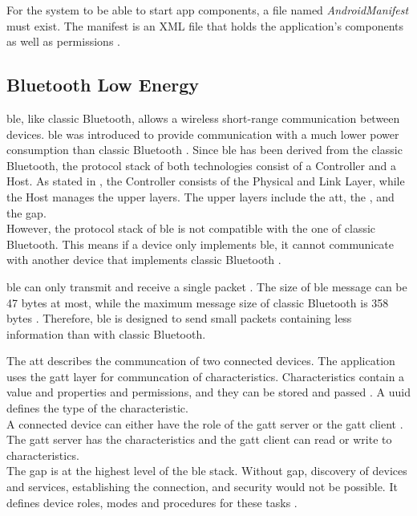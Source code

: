 For the system to be able to start app components, a file named \textit{AndroidManifest} must exist. The manifest is an XML file that holds the application's components as well as permissions \cite{AndroidFundamentals}.


\subsection{Bluetooth Low Energy}
\gls{ble}, like classic Bluetooth, allows a wireless short-range communication between devices. \gls{ble} was introduced to provide communication with a much lower power consumption than classic Bluetooth \cite{GomezOP12}. Since \gls{ble} has been derived from the classic Bluetooth, the protocol stack of both technologies consist of a Controller and a Host. As stated in \cite{GomezOP12}, the Controller consists of the Physical and Link Layer, while the Host manages the upper layers. The upper layers include the \gls{att}, the , and the \gls{gap}. \\
However, the protocol stack of \gls{ble} is not compatible with the one of classic Bluetooth. This means if a device only implements \gls{ble}, it cannot communicate with another device that implements classic Bluetooth \cite{GomezOP12}.

\gls{ble} can only transmit and receive a single packet \cite{Ryan13}. The size of \gls{ble} message can be 47 bytes at most, while the maximum message size of classic Bluetooth is 358 bytes \cite{GomezOP12}. Therefore, \gls{ble} is designed to send small packets containing less information than with classic Bluetooth.

The \gls{att} describes the communcation of two connected devices. The application uses the \gls{gatt} layer for communcation of characteristics. Characteristics contain a value and properties and permissions, and they can be stored and passed \cite{BTGatt}. A \gls{uuid} defines the type of the characteristic. \\
A connected device can either have the role of the \gls{gatt} server or the \gls{gatt} client \cite{TIGatt}. The \gls{gatt} server has the characteristics and the \gls{gatt} client can read or write to characteristics. \\
The \gls{gap} is at the highest level of the \gls{ble} stack. Without \gls{gap}, discovery of devices and services, establishing the connection, and security would not be possible. It defines device roles, modes and procedures for these tasks \cite{GomezOP12}.


